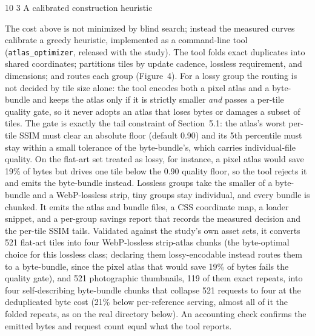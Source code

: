 \documentclass[3p,twocolumn]{elsarticle}
\makeatletter
\renewcommand\subsection{\@startsection{subsection}{2}{\z@}%
           {10\p@ \@plus 3\p@ \@minus 3\p@}%
           {3\p@ \@plus 2\p@ \@minus 1\p@}%
           {\normalfont\normalsize\itshape}}
\makeatother
\begin{document}
\subsection{A calibrated construction
heuristic}

The cost above is not minimized by blind search; instead the measured
curves calibrate a greedy heuristic, implemented as a command-line tool
(\texttt{atlas\_optimizer}, released with the study). The tool folds
exact duplicates into shared coordinates; partitions tiles by update
cadence, lossless requirement, and dimensions; and routes each group
(Figure~4). For a lossy group the routing is not decided by tile size
alone: the tool encodes both a pixel atlas and a byte-bundle and keeps
the atlas only if it is strictly smaller \emph{and} passes a per-tile
quality gate, so it never adopts an atlas that loses bytes or damages a
subset of tiles. The gate is exactly the tail constraint of Section~5.1:
the atlas's worst per-tile SSIM must clear an absolute
floor (default 0.90) and its 5th percentile must stay within a small
tolerance of the byte-bundle's, which carries
individual-file quality. On the flat-art set treated as lossy, for
instance, a pixel atlas would save 19\% of bytes but drives one tile
below the 0.90 quality floor, so the tool rejects it and emits the
byte-bundle instead. Lossless groups take the smaller of a byte-bundle
and a WebP-lossless strip, tiny groups stay individual, and every bundle
is chunked. It emits the atlas and bundle files, a CSS coordinate map, a
loader snippet, and a per-group savings report that records the measured
decision and the per-tile SSIM tails. Validated against the
study's own asset sets, it converts 521 flat-art tiles
into four WebP-lossless strip-atlas chunks (the byte-optimal choice for
this lossless class; declaring them lossy-encodable instead routes them
to a byte-bundle, since the pixel atlas that would save 19\% of bytes
fails the quality gate), and 521 photographic thumbnails, 119 of them
exact repeats, into four self-describing byte-bundle chunks that
collapse 521 requests to four at the deduplicated byte cost (21\% below
per-reference serving, almost all of it the folded repeats, as on the
real directory below). An accounting check confirms the emitted bytes
and request count equal what the tool reports.
\end{document}
